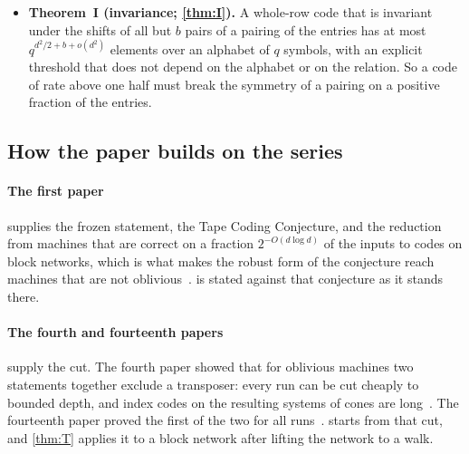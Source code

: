 \begin{itemize}[leftmargin=1.5em]
$9\times6$ grid relation without mutual triangles has value at most $204/5$ against~$41$. Every lift of the Fano
relation whose helper rows respect the incidences and which mixes at one percent has a gap of more than $d^2/100$
between the two bounds. Such lifts exist with both degrees at most $3600$ and girth tending to infinity
(\cref{prop:lifts}, not formalized). So bounds beyond order exist at a fixed window; these relations already have a
constant deficit from order.
\item \textbf{Theorem~I (invariance; \cref{thm:I}).} A whole-row code that is invariant under the shifts of all but
$b$ pairs of a pairing of the entries has at most $q^{d^2/2+b+o(d^2)}$ elements over an alphabet of $q$ symbols, with
an explicit threshold that does not depend on the alphabet or on the relation. So a code of rate above one half must
break the symmetry of a pairing on a positive fraction of the entries.
\end{itemize}

\subsection{How the paper builds on the series}\label{sec:intro-series}

\paragraph{The first paper} supplies the frozen statement, the Tape Coding Conjecture, and the reduction from machines
that are correct on a fraction $2^{-O(d\log d)}$ of the inputs to codes on block networks, which is what makes the
robust form of the conjecture reach machines that are not oblivious~\cite{FirstPaper2026}.  is stated
against that conjecture as it stands there.

\paragraph{The fourth and fourteenth papers} supply the cut. The fourth paper showed that for oblivious machines two
statements together exclude a transposer: every run can be cut cheaply to bounded depth, and index codes on the
resulting systems of cones are long~\cite[Theorem~4.10]{FourthPaper2026}. The fourteenth paper proved the first of the
two for all runs~\cite[Theorem~7.5 and Corollary~9.3]{BoundedStack2026}.  starts from that cut, and \cref{thm:T} applies it to a block
network after lifting the network to a walk.

